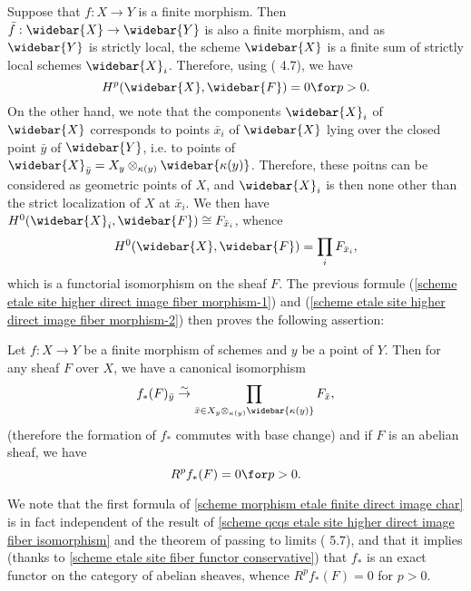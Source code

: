 Suppose that $f:X\to Y$ is a finite morphism. Then $\bar{f}:\widebar{X}\to\widebar{Y}$ is also a finite morphism, and as $\widebar{Y}$ is strictly local, the scheme $\widebar{X}$ is a finite sum of strictly local schemes $\widebar{X}_i$. Therefore, using (\cite{SGA4-2}  4.7), we have
\begin{equation}\label{scheme morphism etale finite direct image char-1}
H^p(\widebar{X},\widebar{F})=0\for p>0.
\end{equation}
On the other hand, we note that the components $\widebar{X}_i$ of $\widebar{X}$ corresponds to points $\bar{x}_i$ of $\widebar{X}$ lying over the closed point $\bar{y}$ of $\widebar{Y}$, i.e. to points of $\widebar{X}_{\bar{y}}=X_y\otimes_{\kappa(y)}\widebar{\kappa(y)}$. Therefore, these poitns can be considered as geometric points of $X$, and $\widebar{X}_i$ is then none other than the strict localization of $X$ at $\bar{x}_i$. We then have $H^0(\widebar{X}_i,\widebar{F})\cong F_{\bar{x}_i}$, whence
\begin{equation}\label{scheme morphism etale finite direct image char-2}
H^0(\widebar{X},\widebar{F})=\prod_iF_{\bar{x}_i},
\end{equation}
which is a functorial isomorphism on the sheaf $F$. The previous formule (\ref{scheme etale site higher direct image fiber morphism-1}) and (\ref{scheme etale site higher direct image fiber morphism-2}) then proves the following assertion:
\begin{proposition}\label{scheme morphism etale finite direct image char}
Let $f:X\to Y$ be a finite morphism of schemes and $y$ be a point of $Y$. Then for any sheaf $F$ over $X$, we have a canonical isomorphism
\begin{equation}\label{scheme morphism etale finite direct image char-3}
f_*(F)_{\bar{y}}\stackrel{\sim}{\to} \prod_{\bar{x}\in X_y\otimes_{\kappa(y)}\widebar{\kappa(y)}}F_{\bar{x}},
\end{equation}
(therefore the formation of $f_*$ commutes with base change) and if $F$ is an abelian sheaf, we have 
\begin{equation}\label{scheme morphism etale finite direct image char-4}
R^pf_*(F)=0\for p>0.
\end{equation}
\end{proposition}

We note that the first formula of \cref{scheme morphism etale finite direct image char} is in fact independent of the result of \cref{scheme qcqs etale site higher direct image fiber isomorphism} and the theorem of passing to limits (\cite{SGA4-2}  5.7), and that it implies (thanks to \cref{scheme etale site fiber functor conservative}) that $f_*$ is an exact functor on the category of abelian sheaves, whence $R^pf_*(F)=0$ for $p>0$.


